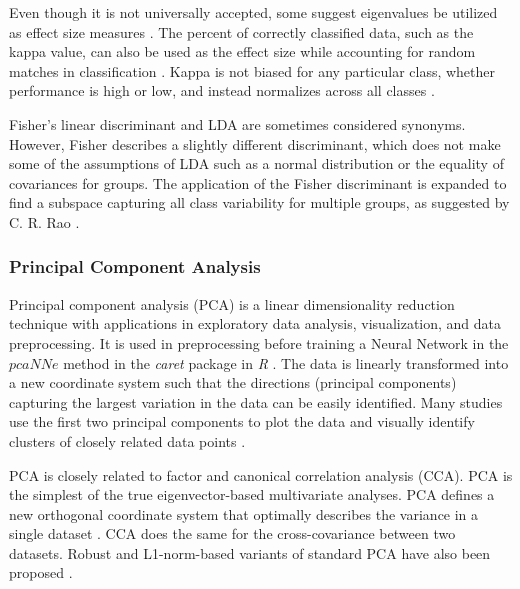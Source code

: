 \documentclass[sn-mathphys-num]{sn-jnl}%
\begin{document}
Even though it is not universally accepted, some suggest eigenvalues be utilized as effect size measures \cite{hansen2005using}. The percent of correctly classified data, such as the kappa value, can also be used as the effect size while accounting for random matches in classification \cite{hansen2005using}. Kappa is not biased for any particular class, whether performance is high or low, and instead normalizes across all classes \cite{israel2006performance}. 

Fisher's linear discriminant and LDA are sometimes considered synonyms. However, Fisher \cite{fisher1936use} describes a slightly different discriminant, which does not make some of the assumptions of LDA such as a normal distribution or the equality of covariances for groups. The application of the Fisher discriminant is expanded to find a subspace capturing all class variability \cite{archive765Discriminant} for multiple groups, as suggested by C. R. Rao \cite{rao1948utilization}.

\subsubsection{Principal Component Analysis}

Principal component analysis (PCA) is a linear dimensionality reduction technique with applications in exploratory data analysis, visualization, and data preprocessing. It is used in preprocessing before training a Neural Network in the $pcaNNe$ method in the \textit{caret} package in \textit{R} \cite{ripley2007pattern}. The data is linearly transformed into a new coordinate system such that the directions (principal components) capturing the largest variation in the data can be easily identified. Many studies use the first two principal components to plot the data and visually identify clusters of closely related data points \cite{jolliffe2016principal}.

PCA is closely related to factor and canonical correlation analysis (CCA). PCA is the simplest of the true eigenvector-based multivariate analyses. PCA defines a new orthogonal coordinate system that optimally describes the variance in a single dataset \cite{barnett1987origins, hsu2012spectral, markopoulos2017efficient, chachlakis2019l1}. CCA does the same for the cross-covariance between two datasets. Robust and L1-norm-based variants of standard PCA have also been proposed \cite{chachlakis2019l1, markopoulos2014optimal, zhan2015robust, ke2005robust}.
\end{document}
